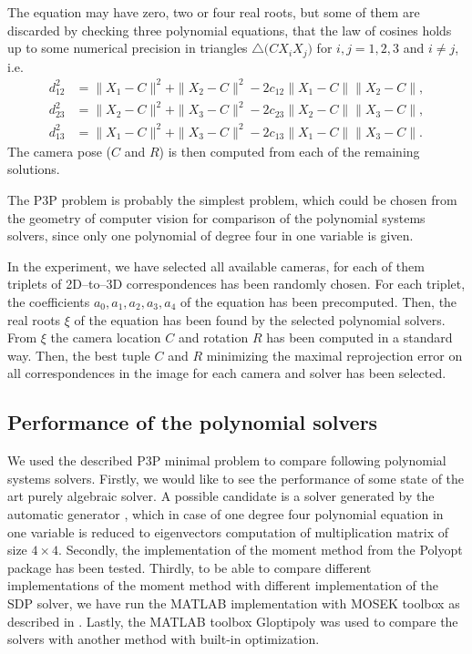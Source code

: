 The equation  may have zero, two or four real roots, but some of them are discarded by checking three polynomial equations, that the law of cosines holds up to some numerical precision in triangles $\triangle\big(CX_iX_j\big)$ for $i,j=1,2,3$ and $i\neq j$, i.e.
\begin{align}
  d_{12}^2 &= \|X_1-C\|^2 + \|X_2-C\|^2 - 2c_{12}\|X_1-C\|\|X_2-C\|,\\
  d_{23}^2 &= \|X_2-C\|^2 + \|X_3-C\|^2 - 2c_{23}\|X_2-C\|\|X_3-C\|,\\
  d_{13}^2 &= \|X_1-C\|^2 + \|X_3-C\|^2 - 2c_{13}\|X_1-C\|\|X_3-C\|.
\end{align}
The camera pose ($C$ and $R$) is then computed from each of the remaining solutions.

The P3P problem is probably the simplest problem, which could be chosen from the geometry of computer vision for comparison of the polynomial systems solvers, since only one polynomial of degree four in one variable is given.


In the experiment, we have selected all available \importAppPPPNumCameras{} cameras, for each of them \importAppPPPNumPoints{} triplets of 2D--to--3D correspondences has been randomly chosen.
For each triplet, the coefficients $a_0, a_1, a_2, a_3, a_4$ of the equation  has been precomputed.
Then, the real roots $\xi$  of the equation  has been found by the selected polynomial solvers.
From $\xi$ the camera location $C$ and rotation $R$ has been computed in a standard way.
Then, the best tuple $C$ and $R$ minimizing the maximal reprojection error on all correspondences in the image for each camera and solver has been selected.

\subsection{Performance of the polynomial solvers}
We used the described P3P minimal problem to compare following polynomial systems solvers.
Firstly, we would like to see the performance of some state of the art purely algebraic solver.
A possible candidate is a solver generated by the automatic generator \cite{autogen}, which in case of one degree four polynomial equation in one variable is reduced to eigenvectors computation of multiplication matrix of size $4\times4$.
Secondly, the implementation of the moment method from the Polyopt package has been tested.
Thirdly, to be able to compare different implementations of the moment method with different implementation of the SDP solver, we have run the MATLAB implementation with MOSEK toolbox as described in .
Lastly, the MATLAB toolbox Gloptipoly \cite{gloptipoly} was used to compare the solvers with another method with built-in optimization.

